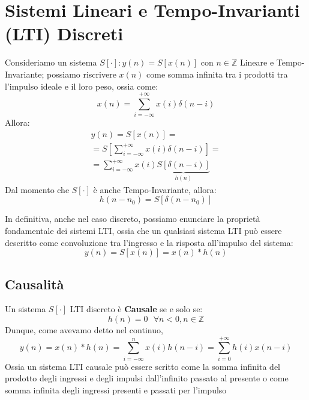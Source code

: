 \section{Sistemi Lineari e Tempo-Invarianti (LTI) Discreti}
Consideriamo un sistema $S[\cdot] : y(n) = S[x(n)]$ con $n \in \mathbb{Z}$ Lineare e Tempo-Invariante; possiamo riscrivere $x(n)$
come somma infinita tra i prodotti tra l'impulso ideale e il loro peso, ossia come:
\begin{equation*}
    x(n) = \sum_{i = -\infty}^{+\infty} x(i)\delta(n-i)
\end{equation*}
Allora:
\begin{gather*}
    y(n) = S[x(n)] = \\ 
         = S\left[\sum_{i = -\infty}^{+\infty} x(i)\delta(n-i)\right] = \\
         =\sum_{i = -\infty}^{+\infty} x(i) \underbrace{S[\delta(n-i)]}_{h(n)}
\end{gather*}
Dal momento che $S[\cdot]$ è anche Tempo-Invariante, allora:
\begin{equation*}
    h(n - n_0) = S\left[\delta(n - n_0)\right]
\end{equation*}
\begin{highlightedeq}
    In definitiva, anche nel caso discreto, possiamo enunciare la proprietà fondamentale dei sistemi LTI, ossia che un qualsiasi sistema LTI
    può essere descritto come convoluzione tra l'ingresso e la risposta all'impulso del sistema:
    \begin{equation}
        y(n) = S[x(n)] = x(n) \ast h(n)
    \end{equation}
\end{highlightedeq}

\subsection{Causalità}
Un sistema $S[\cdot]$ LTI discreto è \textbf{Causale} se e solo se:
\begin{equation}
    h(n) = 0 \mbox{  } \forall n < 0, n \in \mathbb{Z}
\end{equation}
Dunque, come avevamo detto nel continuo,
\begin{equation}
    y(n) = x(n) \ast h(n) = \sum_{i = -\infty}^{n} x(i) h(n - i) = \sum_{i = 0}^{+\infty} h(i) x(n - i)
\end{equation}
Ossia un sistema LTI causale può essere scritto come la somma infinita del prodotto degli ingressi e degli impulsi dall'infinito passato al presente o come 
somma infinita degli ingressi presenti e passati per l'impulso

